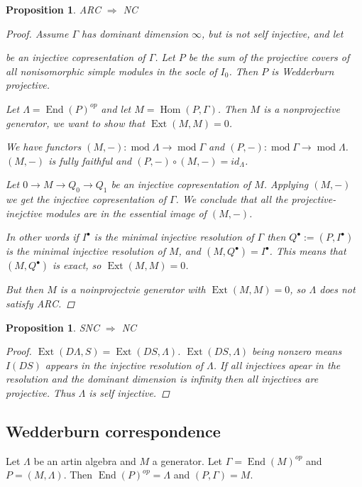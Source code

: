 \documentclass[11pt, a4paper, english]{article}
\newtheorem{prop}[theorem]{Proposition}
\theoremstyle{definition}
\DeclareMathOperator{\Hom}{Hom}
\DeclareMathOperator{\Ext}{Ext}
\DeclareMathOperator{\End}{End}
\def\mod{\operatorname{mod}}
\begin{document}
\begin{prop}
	ARC $\Rightarrow$ NC
	\begin{proof}
		Assume $\Gamma$ has dominant dimension $\infty$, but is not self injective, and let
		\begin{center}
		\end{center}
		be an injective copresentation of $\Gamma$. Let $P$ be the sum of the projective covers of all nonisomorphic simple modules in the socle of $I_0$. Then $P$ is Wedderburn projective.
		
		Let $\Lambda = \End(P)^{op}$ and let $M = \Hom(P, \Gamma)$. Then $M$ is a nonprojective generator, we want to show that $\Ext(M,M)=0$.
		
		We have functors $(M,-):\mod\Lambda \to \mod\Gamma$ and $(P,-):\mod\Gamma \to \mod\Lambda$. $(M, -)$ is fully faithful and $(P,-)\circ (M,-) = id_{\Lambda}$.
		
		Let $0\to M \to Q_0 \to Q_1$ be an injective copresentation of $M$. Applying $(M,-)$ we get the injective copresentation of $\Gamma$. We conclude that all the projective-inejctive modules are in the essential image of $(M,-)$.
		
		In other words if $I^\bullet$ is the minimal injective resolution of $\Gamma$ then $Q^\bullet := (P, I^\bullet)$ is the minimal injective resolution of $M$, and $(M, Q^\bullet)=I^\bullet$. This means that $(M, Q^\bullet)$ is exact, so $\Ext(M,M)=0$. 
		
		But then $M$ is a noinprojectvie generator with $\Ext(M,M)=0$, so $\Lambda$ does not satisfy ARC.
	\end{proof}
\end{prop}

\begin{prop}\cite{AR75}
	SNC $\Rightarrow$ NC
	\begin{proof}
		$\Ext(D\Lambda, S) = \Ext(DS, \Lambda)$. $\Ext(DS, \Lambda)$ being nonzero means $I(DS)$ appears in the injective resolution of $\Lambda$. If all injectives apear in the resolution and the dominant dimension is infinity then all injectives are projective. Thus $\Lambda$ is self injective.
	\end{proof}
\end{prop}

\subsection{Wedderburn correspondence}
Let $\Lambda$ be an artin algebra and $M$ a generator. Let $\Gamma = \End(M)^{op}$ and $P=(M, \Lambda)$. Then $\End(P)^{op} = \Lambda$ and $(P, \Gamma) = M$.
\end{document}
